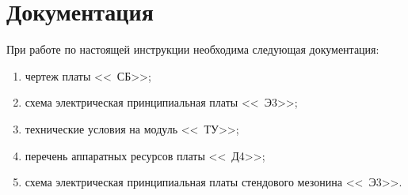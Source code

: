 
\section{Документация}
 \begin{sloppypar}  
  При работе по настоящей инструкции необходима следующая документация:
  \begin{enumerate}    
    \item чертеж платы \DocProductShortTitle <<\DocProductSignature~СБ>>;
    \item схема электрическая принципиальная платы \DocProductShortTitle <<\DocProductSignature~Э3>>;
    \item технические условия на модуль \DocProductShortTitle <<\DocModuleSignature~ТУ>>;
    \item перечень аппаратных ресурсов платы \DocProductShortTitle <<\DocProductSignature~Д4>>;
    \item схема электрическая принципиальная платы стендового мезонина <<\DocStendMezSignature~Э3>>.
  \end{enumerate}
 \end{sloppypar}